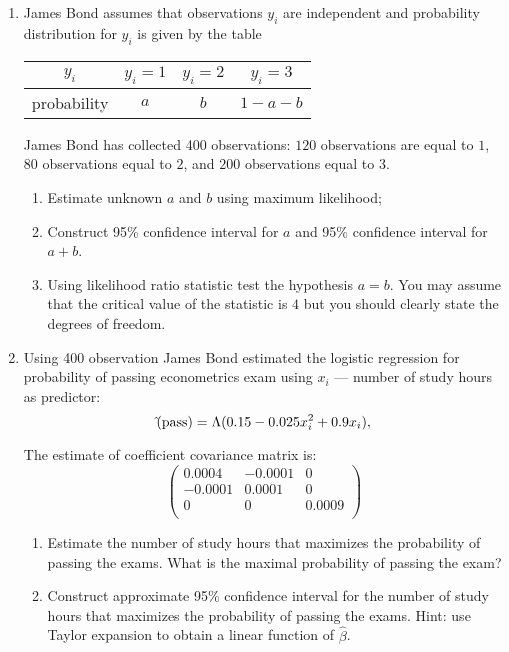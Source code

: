 \documentclass[12pt]{article}
\let\P\relax
\DeclareMathOperator{\P}{\mathbb{P}}
\begin{document}
\begin{enumerate}
 \item James Bond assumes that observations $y_i$ are independent and probability distribution for $y_i$ is given by the table

	 \begin{tabular}{cccc}
		 \toprule
		 $y_i$ & $y_i = 1$ & $y_i = 2$ & $y_i = 3$ \\
		 \midrule
		 probability & $a$ & $b$ & $1 - a-b$ \\
		 \bottomrule
	 \end{tabular}

	 James Bond has collected 400 observations: $120$ observations are equal to $1$, $80$ observations equal to $2$, and $200$ observations equal to $3$.

\begin{enumerate}
 \item Estimate unknown $a$ and $b$ using maximum likelihood;
 \item Construct 95\% confidence interval for $a$ and 95\% confidence interval for $a+b$.
 \item Using likelihood ratio statistic test the hypothesis $a=b$. You may assume that the critical value
 of the statistic is $4$ but you should clearly state the degrees of freedom. 
\end{enumerate}

\newpage
\item Using 400 observation James Bond estimated the logistic regression for probability
of passing econometrics exam using $x_i$ — number of study hours as predictor:
\[
\hat \P(\text{pass}) = \Lambda(0.15 - 0.025 x_i^2 +  0.9x_i),
\]

The estimate of coefficient covariance matrix is:
\[
\begin{pmatrix}
0.0004 & -0.0001 & 0 \\
-0.0001 & 0.0001 & 0 \\
0 & 0 & 0.0009 \\
\end{pmatrix}
\]

\begin{enumerate}
  \item Estimate the number of study hours that maximizes the probability of passing the exams.
  What is the maximal probability of passing the exam?
  \item Construct approximate 95\% confidence interval for the number of study hours that maximizes the probability of passing the exams.
  Hint: use Taylor expansion to obtain a linear function of $\hat\beta$.
\end{enumerate}


\end{enumerate}
\end{document}
